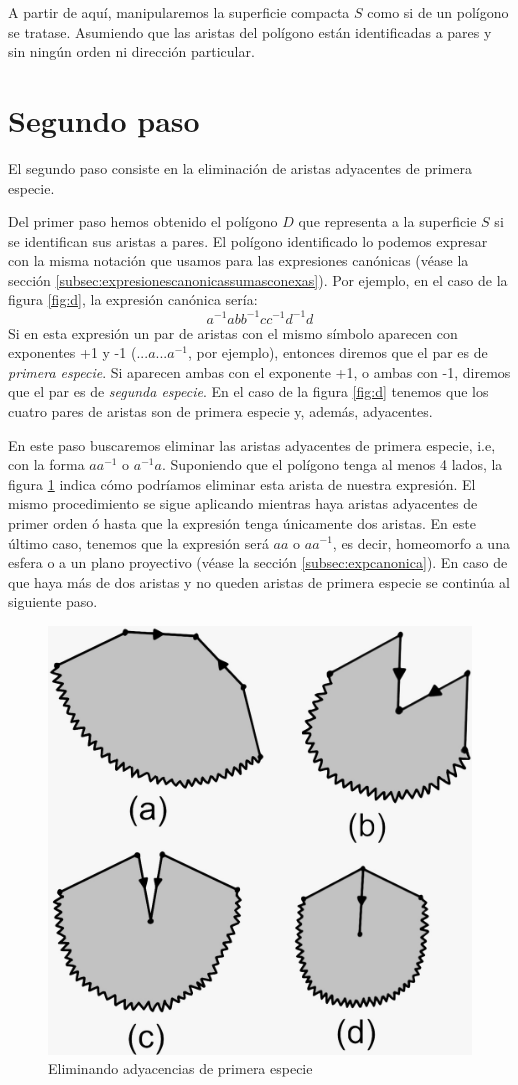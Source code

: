 \documentclass[a4paper,11pt,spanish, twoside, leqno]{tfg-uam}
\theoremstyle{definition}
\begin{document}
A partir de aquí, manipularemos la superficie compacta $S$ como si de un polígono se tratase. Asumiendo que las aristas del polígono están identificadas a pares y sin ningún orden ni dirección particular.


\section{Segundo paso}

El segundo paso consiste en la eliminación de aristas adyacentes de primera especie.

Del primer paso hemos obtenido el polígono $D$ que representa a la superficie $S$ si se identifican sus aristas a pares. El polígono identificado lo podemos expresar con la misma notación que usamos para las expresiones canónicas (véase la sección \ref{subsec:expresionescanonicassumasconexas}). Por ejemplo, en el caso de la figura \ref{fig:d}, la expresión canónica sería:
\[ a^{-1}abb^{-1}cc^{-1}d^{-1}d \]
Si en esta expresión un par de aristas con el mismo símbolo aparecen  con exponentes +1 y -1 ($...a...a^{-1}$, por ejemplo), entonces diremos que el par es de \textit{primera especie}. Si aparecen ambas con el exponente +1, o ambas con -1, diremos que el par es de \textit{segunda especie}. En el caso de la figura \ref{fig:d} tenemos que los cuatro pares de aristas son de primera especie y, además, adyacentes.

En este paso buscaremos eliminar las aristas adyacentes de primera especie, i.e, con la forma $aa^{-1}$ o $a^{-1}a$. Suponiendo que el polígono tenga al menos 4 lados, la figura \ref{fig:paso2} indica cómo podríamos eliminar esta arista de nuestra expresión. El mismo procedimiento se sigue aplicando mientras haya aristas adyacentes de primer orden ó hasta que la expresión tenga únicamente dos aristas. En este último caso, tenemos que la expresión será $aa$ o $aa^{-1}$, es decir, homeomorfo a una esfera o a un plano proyectivo (véase la sección \ref{subsec:expcanonica}). En caso de que haya más de dos aristas y no queden aristas de primera especie se continúa al siguiente paso.
\begin{figure}[h!]
	\centering
	\includegraphics[width=0.4\linewidth]{imagenes/paso2.jpeg}
	\caption{Eliminando adyacencias de primera especie}
	\label{fig:paso2}
\end{figure}
\end{document}
